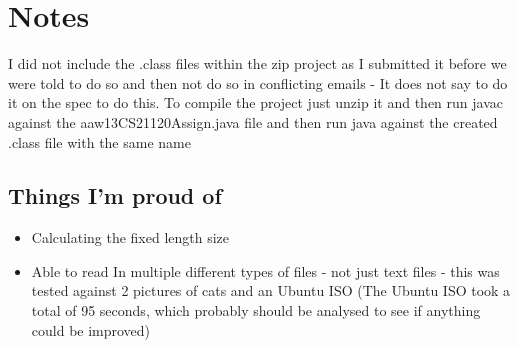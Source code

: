 \documentclass[11pt, oneside]{amsart}
\begin{document}
\section{Notes}
	I did not include the .class files within the zip project as I submitted it before we were told to do so and then not do so in conflicting emails - It does not say to do it on the spec to do this.
	To compile the project just unzip it and then run javac against the aaw13CS21120Assign.java file and then run java against the created .class file with the same name
	\subsection{Things I'm proud of}
	\begin{itemize}
		\item Calculating the fixed length size
		\item Able to read In multiple different types of files - not just text files - this was tested against 2 pictures of cats and an Ubuntu ISO (The Ubuntu ISO took a total of 95 seconds, which probably should be analysed to see if anything could be improved)
	\end{itemize}
\end{document}
